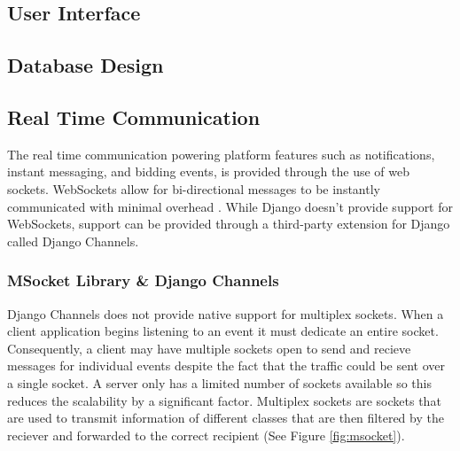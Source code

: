\subsection{User Interface}
\subsection{Database Design}

\subsection{Real Time Communication}\label{realtime}

The real time communication powering platform features such as notifications,
instant messaging, and bidding events, is provided through the use of web
sockets. WebSockets allow for bi-directional messages to be instantly
communicated with minimal overhead \parencite{websocket}. While Django doesn't
provide support for WebSockets, support can be provided through a third-party
extension for Django called Django Channels.

\subsubsection{MSocket Library \& Django Channels}

Django Channels does not provide native support for multiplex sockets. When
a client application begins listening to an event it must dedicate an entire
socket. Consequently, a client may have multiple sockets open to send and
recieve messages for individual events despite the fact that the traffic could
be sent over a single socket. A server only has a limited number of sockets
available so this reduces the scalability by a significant factor. Multiplex
sockets are sockets that are used to transmit information of different classes
that are then filtered by the reciever and forwarded to the correct recipient
(See Figure \ref{fig:msocket}).

